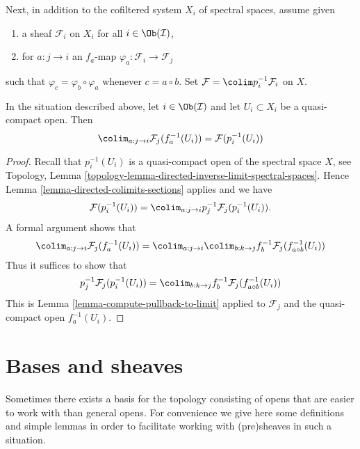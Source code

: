 \noindent
Next, in addition to the cofiltered system $X_i$ of spectral spaces,
assume given
\begin{enumerate}
\item a sheaf $\mathcal{F}_i$ on $X_i$ for all $i \in \Ob(\mathcal{I})$,
\item for $a : j \to i$ an $f_a$-map
$\varphi_a : \mathcal{F}_i \to \mathcal{F}_j$
\end{enumerate}
such that $\varphi_c = \varphi_b \circ \varphi_a$
whenever $c = a \circ b$. Set $\mathcal{F} = \colim p_i^{-1}\mathcal{F}_i$
on $X$.

\begin{lemma}
\label{lemma-descend-opens}
In the situation described above, let $i \in \Ob(\mathcal{I})$ and let
$U_i \subset X_i$ be a quasi-compact open. Then
$$
\colim_{a : j \to i} \mathcal{F}_j(f_a^{-1}(U_i)) = \mathcal{F}(p_i^{-1}(U_i))
$$
\end{lemma}

\begin{proof}
Recall that $p_i^{-1}(U_i)$ is a quasi-compact open of the spectral space
$X$, see
Topology, Lemma \ref{topology-lemma-directed-inverse-limit-spectral-spaces}.
Hence Lemma \ref{lemma-directed-colimits-sections} applies and we have
$$
\mathcal{F}(p_i^{-1}(U_i)) =
\colim_{a : j \to i} p_j^{-1}\mathcal{F}_j(p_i^{-1}(U_i)).
$$
A formal argument shows that
$$
\colim_{a : j \to i} \mathcal{F}_j(f_a^{-1}(U_i)) =
\colim_{a : j \to i} \colim_{b : k \to j}
f_b^{-1}\mathcal{F}_j(f_{a \circ b}^{-1}(U_i))
$$
Thus it suffices to show that
$$
p_j^{-1}\mathcal{F}_j(p_i^{-1}(U_i)) =
\colim_{b : k \to j} f_b^{-1}\mathcal{F}_j(f_{a \circ b}^{-1}(U_i))
$$
This is Lemma \ref{lemma-compute-pullback-to-limit}
applied to $\mathcal{F}_j$ and the quasi-compact open $f_a^{-1}(U_i)$.
\end{proof}

















\section{Bases and sheaves}
\label{section-bases}

\noindent
Sometimes there exists a basis for the topology
consisting of opens that are easier to work with
than general opens. For convenience we give here
some definitions and simple lemmas in order to
facilitate working with (pre)sheaves in such a situation.

